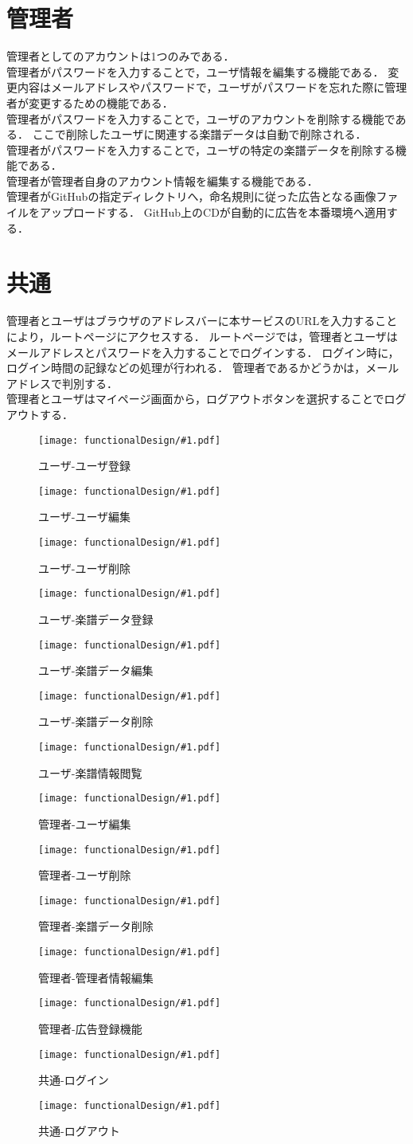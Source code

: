 \section{管理者}
管理者としてのアカウントは1つのみである．\\
管理者がパスワードを入力することで，ユーザ情報を編集する機能である．
変更内容はメールアドレスやパスワードで，ユーザがパスワードを忘れた際に管理者が変更するための機能である．\\
管理者がパスワードを入力することで，ユーザのアカウントを削除する機能である．
ここで削除したユーザに関連する楽譜データは自動で削除される．\\
管理者がパスワードを入力することで，ユーザの特定の楽譜データを削除する機能である．\\
管理者が管理者自身のアカウント情報を編集する機能である．\\
管理者がGitHubの指定ディレクトリへ，命名規則に従った広告となる画像ファイルをアップロードする．
GitHub上のCDが自動的に広告を本番環境へ適用する．
\section{共通}
管理者とユーザはブラウザのアドレスバーに本サービスのURLを入力することにより，ルートページにアクセスする．
ルートページでは，管理者とユーザはメールアドレスとパスワードを入力することでログインする．
ログイン時に，ログイン時間の記録などの処理が行われる．
管理者であるかどうかは，メールアドレスで判別する．\\
管理者とユーザはマイページ画面から，ログアウトボタンを選択することでログアウトする．
\newcommand{\icd}[2]{\begin{figure}[p]\centering\texttt{[image: functionalDesign/\#1.pdf]}\caption{#2}\label{#2}\end{figure}}
\icd{211-機能設計-利用者側-ユーザ登録}{ユーザ-ユーザ登録}
\icd{212-機能設計-利用者側-ユーザ編集}{ユーザ-ユーザ編集}
\icd{213-機能設計-利用者側-ユーザ削除}{ユーザ-ユーザ削除}
\icd{214-機能設計-利用者側-楽譜データ登録}{ユーザ-楽譜データ登録}
\icd{215-機能設計-利用者側-楽譜データ編集}{ユーザ-楽譜データ編集}
\icd{216-機能設計-利用者側-楽譜データ削除}{ユーザ-楽譜データ削除}
\icd{217-機能設計-利用者側-楽譜情報閲覧}{ユーザ-楽譜情報閲覧}
\icd{221-機能設計-管理者側-ユーザ編集}{管理者-ユーザ編集}
\icd{222-機能設計-管理者側-ユーザ削除}{管理者-ユーザ削除}
\icd{223-機能設計-管理者側-楽譜データ削除}{管理者-楽譜データ削除}
\icd{224-機能設計-管理者側-管理者情報編集機能}{管理者-管理者情報編集}
\icd{225-機能設計-管理者側-広告登録機能}{管理者-広告登録機能}
\icd{231-機能設計-利用者側-ログイン}{共通-ログイン}
\icd{232-機能設計-利用者側-ログアウト}{共通-ログアウト}
